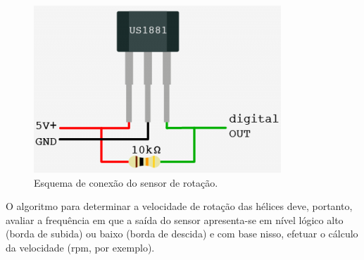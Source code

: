 	\begin{figure}[!htbp]
	  \centering
	  \includegraphics[scale=0.4]{editaveis/figuras/sensor_rotacao_conexao}
	  \caption[Esquema de conexão do sensor de rotação]
	  {Esquema de conexão do sensor de rotação. \footnotemark}
	  \label{sensor_rotacao_conexao}
	\end{figure}
	
	O algoritmo para determinar a velocidade de rotação das hélices deve, portanto, avaliar a frequência em que a saída do
	sensor apresenta-se em nível lógico alto (borda de subida) ou baixo (borda de descida) e com base nisso, efetuar o
	cálculo da velocidade (rpm, por exemplo).